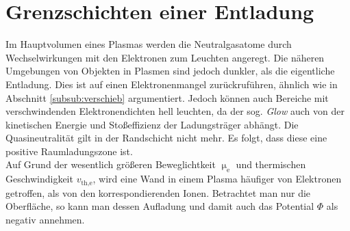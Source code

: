\documentclass[numbers=noenddot,a4paper,notitlepage,twoside,BCOR15mm]{scrbook}
\newcommand{\ix}[1]{_\text{#1}}
\newcommand{\tilt}[1]{\textit{#1}}
\begin{document}
%
%

		\section{Grenzschichten einer Entladung}\label{sub:rand}

			Im Hauptvolumen eines Plasmas werden die Neutralgasatome durch Wechselwirkungen mit den Elektronen zum Leuchten angeregt. Die näheren Umgebungen von Objekten in Plasmen sind jedoch dunkler, als die eigentliche Entladung. Dies ist auf einen Elektronenmangel zur\"uckruf\"uhren, ähnlich wie in Abschnitt \ref{subsub:verschieb} argumentiert. Jedoch können auch Bereiche mit verschwindenden Elektronendichten hell leuchten, da der sog. \tilt{Glow} auch von der kinetischen Energie und Stoßeffizienz der Ladungsträger abhängt. Die Quasineutralit\"at gilt in der Randschicht nicht mehr. Es folgt, dass diese eine positive Raumladungszone ist. \\
			Auf Grund der wesentlich gr\"o{\ss}eren Beweglichtkeit $\upmu\ix{e}$ und thermischen Geschwindigkeit $v\ix{th,e}$, wird eine Wand in einem Plasma h\"aufiger von Elektronen getroffen, als von den korrespondierenden Ionen. Betrachtet man nur die Oberfl\"ache, so kann man dessen Aufladung und damit auch das Potential $\Phi$ als negativ annehmen.
\end{document}
